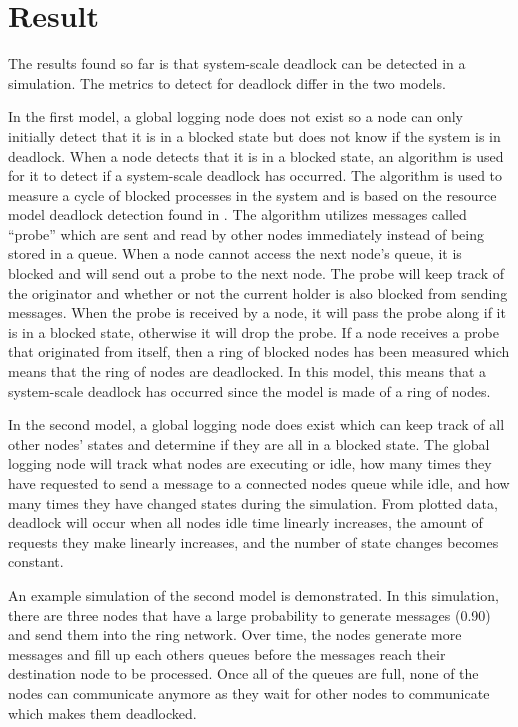 \documentclass{article}
\begin{document}
\section{Result} %

The results found so far is that system-scale deadlock can be detected in a simulation. The metrics to detect for deadlock differ in the two models.

In the first model, a global logging node does not exist so a node can only initially detect that it is in a blocked state but does not know if the system is in deadlock. When a node detects that it is in a blocked state, an algorithm is used for it to detect if a system-scale deadlock has occurred. The algorithm is used to measure a cycle of blocked processes in the system and is based on the resource model deadlock detection found in \cite[p. 149]{1983_Chandy}. The algorithm utilizes messages called ``probe'' which are sent and read by other nodes immediately instead of being stored in a queue. When a node cannot access the next node's queue, it is blocked and will send out a probe to the next node. The probe will keep track of the originator and whether or not the current holder is also blocked from sending messages. When the probe is received by a node, it will pass the probe along if it is in a blocked state, otherwise it will drop the probe. If a node receives a probe that originated from itself, then a ring of blocked nodes has been measured which means that the ring of nodes are deadlocked. In this model, this means that a system-scale deadlock has occurred since the model is made of a ring of nodes.

In the second model, a global logging node does exist which can keep track of all other nodes' states and determine if they are all in a blocked state. The global logging node will track what nodes are executing or idle, how many times they have requested to send a message to a connected nodes queue while idle, and how many times they have changed states during the simulation. From plotted data, deadlock will occur when all nodes idle time linearly increases, the amount of requests they make linearly increases, and the number of state changes becomes constant. 

An example simulation of the second model is demonstrated. In this simulation, there are three nodes that have a large probability to generate messages (0.90) and send them into the ring network. Over time, the nodes generate more messages and fill up each others queues before the messages reach their destination node to be processed. Once all of the queues are full, none of the nodes can communicate anymore as they wait for other nodes to communicate which makes them deadlocked.
\end{document}
